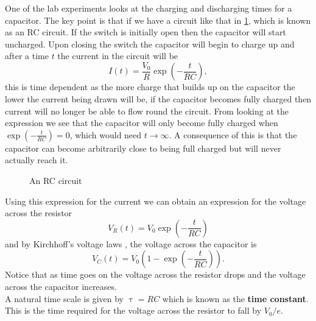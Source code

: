 \documentclass[a4paper,12pt]{book}
\begin{document}
One of the lab experiments looks at the charging and discharging times for a capacitor. The key point is that if we have a circuit like that in \cref{fig: RC circuit}, which is known as an RC circuit. If the switch is initially open then the capacitor will start uncharged. Upon closing the switch the capacitor will begin to charge up and after a time $t$ the current in the circuit will be
\begin{equation*}
I(t)=\frac{V_{0}}{R}\exp\left(-\frac{t}{RC}\right),
\end{equation*}
this is time dependent as the more charge that builds up on the capacitor the lower the current being drawn will be, if the capacitor becomes fully charged then current will no longer be able to flow round the circuit. From looking at the expression we see that the capacitor will only become fully charged when $\exp\left(-\frac{t}{RC}\right)=0$, which would need $t\to \infty$. A consequence of this is that the capacitor can become arbitrarily close to being full charged but will never actually reach it.\\

     \begin{figure}[ht]
    \centering
    \caption{An RC circuit}
    \label{fig: RC circuit}
\end{figure}
Using this expression for the current we can obtain an expression for the voltage across the resistor
\begin{equation*}
V_{R}(t)=V_{0}\exp\left(-\frac{t}{RC}\right)
\end{equation*}
and by Kirchhoff's voltage laws , the voltage across the capacitor is
\begin{equation*}
V_{C}(t)=V_{0}\left(1-\exp\left(-\frac{t}{RC}\right)\right).
\end{equation*}
Notice that as time goes on the voltage across the resistor drops and the voltage across the capacitor increases.\\
 
A natural time scale is given by $\uptau=RC$ which is known as the \textbf{time constant}. This is the time required for the voltage across the resistor to fall by $V_{0}/e$.\\
\end{document}
